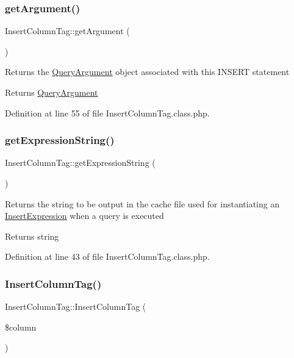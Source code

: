 \subsubsection{\texorpdfstring{get\+Argument()}{getArgument()}}
{\footnotesize\ttfamily Insert\+Column\+Tag\+::get\+Argument (\begin{DoxyParamCaption}{ }\end{DoxyParamCaption})}

Returns the \hyperlink{classQueryArgument}{Query\+Argument} object associated with this I\+N\+S\+E\+RT statement

\begin{DoxyReturn}{Returns}
\hyperlink{classQueryArgument}{Query\+Argument} 
\end{DoxyReturn}


Definition at line 55 of file Insert\+Column\+Tag.\+class.\+php.

\mbox{\label{classInsertColumnTag_a77e3aba891447e4d9fddc8a91c6ca9da}} 
\subsubsection{\texorpdfstring{get\+Expression\+String()}{getExpressionString()}}
{\footnotesize\ttfamily Insert\+Column\+Tag\+::get\+Expression\+String (\begin{DoxyParamCaption}{ }\end{DoxyParamCaption})}

Returns the string to be output in the cache file used for instantiating an \hyperlink{classInsertExpression}{Insert\+Expression} when a query is executed

\begin{DoxyReturn}{Returns}
string 
\end{DoxyReturn}


Definition at line 43 of file Insert\+Column\+Tag.\+class.\+php.

\mbox{\label{classInsertColumnTag_a7ca1654435b7a6e73d269f9e4f50e119}} 
\subsubsection{\texorpdfstring{Insert\+Column\+Tag()}{InsertColumnTag()}}
{\footnotesize\ttfamily Insert\+Column\+Tag\+::\+Insert\+Column\+Tag (\begin{DoxyParamCaption}\item[{}]{\$column }\end{DoxyParamCaption})}

